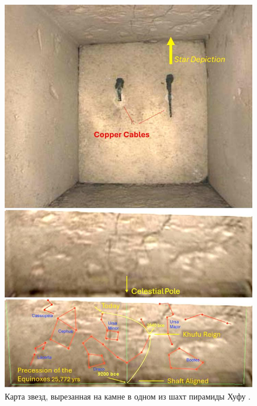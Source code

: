 \documentclass[10pt,twocolumn,letterpaper]{article}
\begin{document}
\begin{figure}[H]
\begin{center}
   \includegraphics[width=1\linewidth]{star-stone.jpg}
\end{center}
   \caption{Карта звезд, вырезанная на камне в одном из шахт пирамиды Хуфу \cite{28}.}
\label{fig:20}
\label{fig:onecol}
\end{figure}
\end{document}
